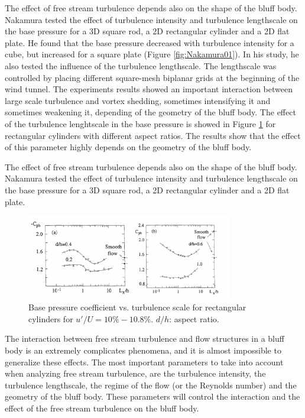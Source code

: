 \documentclass[journal]{new-aiaa}
\begin{document}
The effect of free stream turbulence depends also on the shape of the bluff body. Nakamura \cite{nakamura1993bluffbody} tested the effect of turbulence intensity and turbulence lengthscale on the base pressure for a 3D square rod, a 2D rectangular cylinder and a 2D flat plate. He found that the base pressure decreased with turbulence intensity for a cube, but increased for a square plate (Figure \ref{fig:Nakamura01}). In his study, he also tested the influence of the turbulence lengthscale. The lengthscale was controlled by placing different square-mesh biplanar grids at the beginning of the wind tunnel. The experiments results showed an important interaction between large scale turbulence and vortex shedding, sometimes intensifying it and sometimes weakening it, depending of the geometry of the bluff body. The effect of the turbulence lenghtscale in the base pressure is showed in Figure \ref{fig:Nakamura02} for rectangular cylinders with different aspect ratios. The results show that the effect of this parameter highly depends on the geometry of the bluff body.  

The effect of free stream turbulence depends also on the shape of the bluff body. Nakamura \cite{nakamura1993bluffbody} tested the effect of turbulence intensity and turbulence lengthscale on the base pressure for a 3D square rod, a 2D rectangular cylinder and a 2D flat plate.



\begin{figure}[H]
\begin{center}
\includegraphics[width=0.8\textwidth]{Images/federico/Figure08}
\caption{Base pressure coefficient vs. turbulence scale for rectangular cylinders for $u'/U = 10\%-10.8\%$. $d/h$: aspect ratio.}
\label{fig:Nakamura02}
\end{center}
\end{figure}

The interaction between free stream turbulence and flow structures in a bluff body is an extremely complicates phenomena, and it is almost impossible to generalize these effects. The most important parameters to take into account when analyzing free stream turbulence, are the turbulence intensity, the turbulence lengthscale, the regime of the flow (or the Reynolds number) and the geometry of the bluff body. These parameters will control the interaction and the effect of the free stream turbulence on the bluff body.
\end{document}
